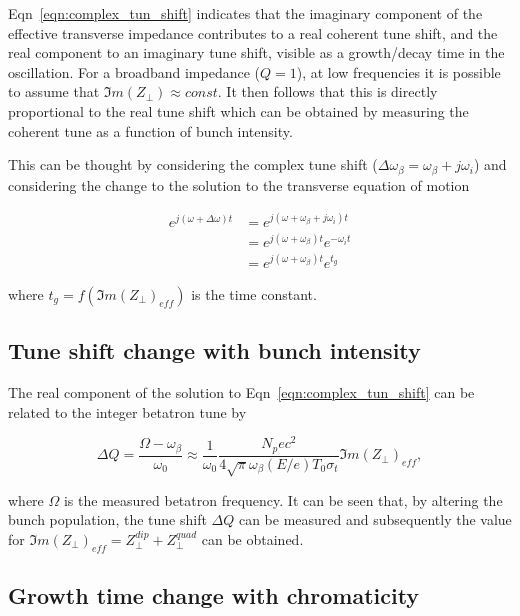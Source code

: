 Eqn~\ref{eqn:complex_tun_shift} indicates that the imaginary component of the effective transverse impedance contributes to a real coherent tune shift, and the real component to an imaginary tune shift, visible as a growth/decay time in the oscillation. For a broadband impedance ($Q=1$), at low frequencies it is possible to assume that $\Im{}m\left(  Z_{\perp} \right) \approx const.$ It then follows that this is directly proportional to the real tune shift which can be obtained by measuring the coherent tune as a function of bunch intensity.

This can be thought by considering the complex tune shift ($\Delta \omega_{\beta} = \omega_{\beta} + j\omega_{i}$) and considering the change to the solution to the transverse equation of motion

\begin{align}
e^{j\left( \omega + \Delta \omega \right) t } &= e^{j\left( \omega + \omega_{\beta} + j \omega_{i} \right) t } \nonumber \\
& = e^{j\left( \omega + \omega_{\beta}\right) t }e^{- \omega_{i}  t } \nonumber \\
& = e^{j\left( \omega + \omega_{\beta}\right) t }e^{ t_{g} }
\end{align}

where $t_{g} = f ( \Im{}m { (  Z_{\perp} )_{eff} } )$ is the time constant.
 
\subsection{Tune shift change with bunch intensity}
\label{sec:tune-shift-bunch-int}

The real component of the solution to Eqn~\ref{eqn:complex_tun_shift} can be related to the integer betatron tune by

\begin{equation}
\Delta Q = \frac{\Omega - \omega_{\beta}}{\omega_{0}} \approx \frac{1}{\omega_{0}} \frac{N_{p}ec^{2}}{4\sqrt{\pi}\omega_{\beta} \left( E/e \right)T_{0}\sigma_{t}} \Im{}m\left(  Z_{\perp} \right)_{eff},
\end{equation} 

where $\Omega$ is the measured betatron frequency. It can be seen that, by altering the bunch population, the tune shift $\Delta Q$ can be measured and subsequently the value for $\Im{}m\left(  Z_{\perp} \right)_{eff} = Z_{\perp}^{dip} + Z_{\perp}^{quad}$ can be obtained.

\subsection{Growth time change with chromaticity}
\label{sec:growth-time-chrom}

